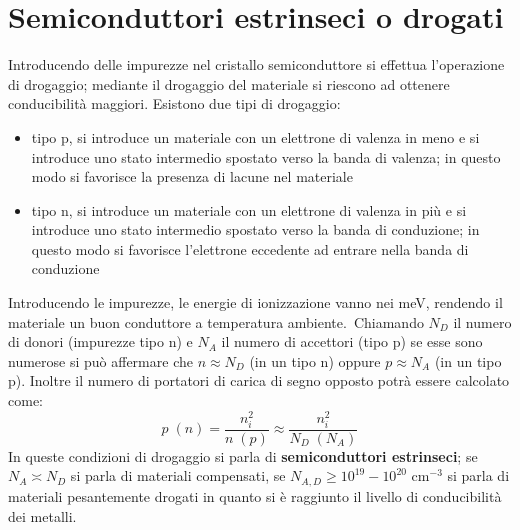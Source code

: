 \section{Semiconduttori estrinseci o drogati}
Introducendo delle impurezze nel cristallo semiconduttore si effettua l'operazione di drogaggio; mediante il drogaggio del materiale si riescono ad ottenere conducibilit\`a maggiori.
Esistono due tipi di drogaggio:
\begin{itemize}
\item tipo p, si introduce un materiale con un elettrone di valenza in meno e si introduce uno stato intermedio spostato verso la banda di valenza;
in questo modo si favorisce la presenza di lacune nel materiale
\item tipo n, si introduce un materiale con un elettrone di valenza in pi\`u e si introduce uno stato intermedio spostato verso la banda di conduzione;
in questo modo si favorisce l'elettrone eccedente ad entrare nella banda di conduzione
\end{itemize}
Introducendo le impurezze, le energie di ionizzazione vanno nei meV, rendendo il materiale un buon conduttore a temperatura ambiente.\
Chiamando $N_D$ il numero di donori (impurezze tipo n) e $N_A$ il numero di accettori (tipo p) se esse sono numerose si pu\`o affermare
che $n \approx N_D$ (in un tipo n) oppure $p \approx N_A$ (in un tipo p).
Inoltre il numero di portatori di carica di segno opposto potr\`a essere calcolato come:
\begin{equation*}
p \;(n) = \frac{n_i^2}{n \; (p)} \approx \frac{n_i^2}{N_D\;(N_A)}
\end{equation*}
In queste condizioni di drogaggio si parla di \textbf{semiconduttori estrinseci};
se $N_A \asymp N_D$ si parla di materiali compensati, se $N_{A,D} \ge 10^{19} - 10^{20}$ cm$^{-3}$ si parla di materiali pesantemente drogati
in quanto si \`e raggiunto il livello di conducibilit\`a dei metalli.
